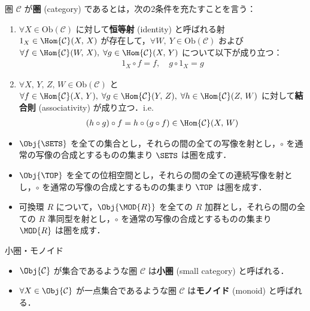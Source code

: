 \documentclass[algtopo_main]{subfiles}
\begin{document}
\begin{mydef}[label=def:category]{圏}
    $\mathcal{C}$ が\textbf{圏} (category) であるとは，次の2条件を充たすことを言う：
    \begin{enumerate}
        \item $\forall  X \in \mathrm{Ob}(\mathcal{C})$ に対して\textbf{恒等射} (identity) と呼ばれる射 $1_X \in \Hom{\mathcal{C}}(X,\, X)$ が存在して，$\forall W,\ Y \in \mathrm{Ob}(\mathcal{C})$ および $\forall f \in \Hom{\mathcal{C}}(W,\, X),\; \forall g \in \Hom{\mathcal{C}}(X,\, Y)$ について以下が成り立つ：
        \begin{align}
            1_X \circ f = f,\quad g \circ 1_X = g
        \end{align}
        \item $\forall  X,\, Y,\, Z,\, W \in \mathrm{Ob}(\mathcal{C})$ と $\forall f \in \Hom{\mathcal{C}}(X,\, Y),\; \forall g \in \Hom{\mathcal{C}}(Y,\, Z),\; \forall h \in \Hom{\mathcal{C}}(Z,\, W)$ に対して\textbf{結合則} (associativity) が成り立つ．i.e.
        \begin{align}
            (h \circ g) \circ f = h \circ (g \circ f) \in \Hom{\mathcal{C}}(X,\, W)
        \end{align}
    \end{enumerate}
\end{mydef}

\begin{itemize}
    \item $\Obj{\SETS}$ を全ての集合とし，それらの間の全ての写像を射とし，$\circ$ を通常の写像の合成とするものの集まり $\SETS$ は圏を成す．
    \item $\Obj{\TOP}$ を全ての位相空間とし，それらの間の全ての連続写像を射とし，$\circ$ を通常の写像の合成とするものの集まり $\TOP$ は圏を成す．
    \item 可換環 $R$ について，$\Obj{\MOD{R}}$ を全ての $R$ 加群とし，それらの間の全ての $R$ 準同型を射とし，$\circ$ を通常の写像の合成とするものの集まり $\MOD{R}$ は圏を成す．
\end{itemize}

\begin{mydef}[label=def:small-monoid]{小圏・モノイド}
    \begin{itemize}
        \item $\Obj{\mathcal{C}}$ が集合であるような圏 $\mathcal{C}$ は\textbf{小圏} (small category) と呼ばれる．
        \item $\forall X \in \Obj{\mathcal{C}}$ が一点集合であるような圏 $\mathcal{C}$ は\textbf{モノイド} (monoid) と呼ばれる．
    \end{itemize}
\end{mydef}
\end{document}
